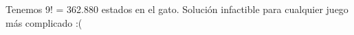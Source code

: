 \documentclass[preview]{standalone}
\begin{document}
\begin{center}
Tenemos 9! = 362.880 estados en el gato.
         Solución infactible para cualquier juego más complicado :(
\end{center}
\end{document}
